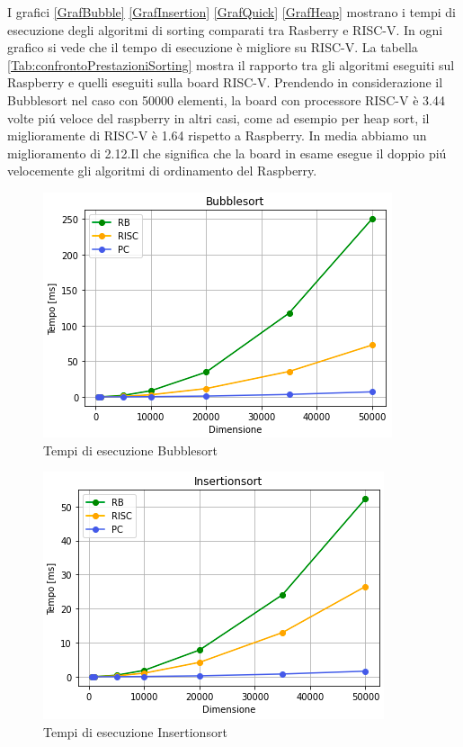 \documentclass[12pt, a4paper]{report}
\begin{document}
I grafici \ref{GrafBubble} \ref{GrafInsertion} \ref{GrafQuick} \ref{GrafHeap} mostrano i tempi di esecuzione degli algoritmi di sorting comparati tra Rasberry e RISC-V. In ogni grafico si vede che il tempo di esecuzione è migliore su RISC-V. 
La tabella \ref{Tab:confrontoPrestazioniSorting} mostra il rapporto tra gli algoritmi eseguiti sul Raspberry e quelli eseguiti sulla board RISC-V. Prendendo in considerazione il Bubblesort nel caso con 50000 elementi, la board con processore RISC-V è 3.44 volte pi\'u veloce del raspberry in altri casi, come ad esempio per heap sort, il miglioramente di RISC-V è 1.64 rispetto a Raspberry. In media abbiamo un miglioramento di 2.12.Il che significa che la board in esame esegue il doppio pi\'u velocemente gli algoritmi di ordinamento del Raspberry.


\begin{figure}[ht]
\centering
 \includegraphics[scale=0.8]{Img/GraficiSorting/Bubblesort_All.PNG}
 \caption{Tempi di esecuzione Bubblesort}
\end{figure}

\begin{figure}[ht]
\centering
 \includegraphics[scale=0.8]{Img/GraficiSorting/Insertionsort_All.PNG}
 \caption{Tempi di esecuzione Insertionsort}
\end{figure}
	
\end{document}
